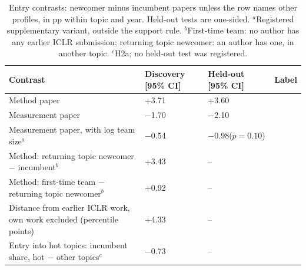 \begin{table}[tb]
\centering
\footnotesize
\setlength{\tabcolsep}{3pt}
\renewcommand{\arraystretch}{1.1}
\begin{tabularx}{\textwidth}{@{}Y L{2.7cm} L{2.7cm} L{2.4cm}@{}}
\toprule
Contrast & Discovery [95\% CI] & Held-out [95\% CI] & Label \\
\midrule
Method paper & +3.71\newline[+2.61, +4.80] & +3.60\newline[+1.48, +5.71] &  \\
Measurement paper & $-$1.70\newline[$-$2.46, $-$0.93] & $-$2.10\newline[$-$3.35, $-$0.85] &  \\
Measurement paper, with log team size$^a$ & $-$0.54\newline[$-$1.11, +0.04] & $-$0.98\newline($p = 0.10$) &
 \\
\addlinespace
Method: returning topic newcomer $-$ incumbent$^b$ & +3.43\newline[+2.31, +4.55] & -- &  \\
Method: first-time team $-$ returning topic newcomer$^b$ & +0.92\newline[$-$0.44, +2.29] & -- &  \\
Distance from earlier ICLR work, own work excluded (percentile points) & +4.33\newline[+3.44, +5.22] & -- &
 \\
\addlinespace
Entry into hot topics: incumbent share, hot $-$ other topics$^c$ & $-$0.73\newline[$-$2.68, +1.22] & -- &
 \\
\bottomrule
\end{tabularx}
\caption[Entry contrasts between newcomer and incumbent papers]{Entry contrasts: newcomer minus incumbent papers
unless the row names other profiles, in pp within topic and year. Held-out tests are one-sided. $^a$Registered
supplementary variant, outside the support rule. $^b$First-time team: no author has any earlier ICLR submission;
returning topic newcomer: an author has one, in another topic. $^c$H2a; no held-out test was registered.}
\label{tab:entry}
\end{table}

